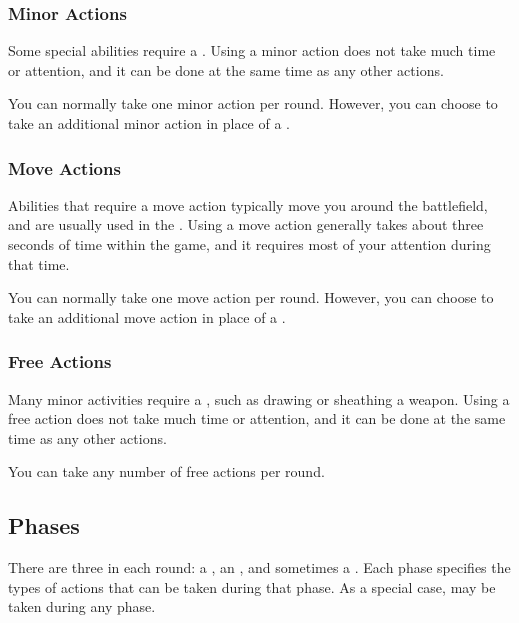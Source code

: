         \subsubsection{Minor Actions}\label{Minor Actions}
            Some special abilities require a .
            Using a minor action does not take much time or attention, and it can be done at the same time as any other actions.

            You can normally take one minor action per round.
            However, you can choose to take an additional minor action in place of a .

        \subsubsection{Move Actions}\label{Move Actions}
            Abilities that require a move action typically move you around the battlefield, and are usually used in the .
            Using a move action generally takes about three seconds of time within the game, and it requires most of your attention during that time.

            You can normally take one move action per round.
            However, you can choose to take an additional move action in place of a .

        \subsubsection{Free Actions}\label{Free Actions}
            Many minor activities require a , such as drawing or sheathing a weapon.
            Using a free action does not take much time or attention, and it can be done at the same time as any other actions.

            You can take any number of free actions per round.

    \subsection{Phases}\label{Phases}

        There are three  in each round: a , an , and sometimes a .
        Each phase specifies the types of actions that can be taken during that phase.
        As a special case,  may be taken during any phase.

